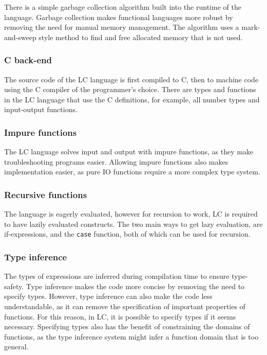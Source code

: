 \documentclass[12pt]{article}
\begin{document}
There is a simple garbage collection algorithm built into the runtime of the
language. Garbage collection makes functional languages more robust by removing
the need for manual memory management. The algorithm uses a mark-and-sweep style
method to find and free allocated memory that is not used.

\subsubsection{C back-end}

The source code of the LC language is first compiled to C, then to machine code
using the C compiler of the programmer's choice. There are types and functions
in the LC language that use the C definitions, for example, all number types and
input-output functions.

\subsubsection{Impure functions}

The LC language solves input and output with impure functions, as they make
troubleshooting programs easier. Allowing impure functions also makes
implementation easier, as pure IO functions require a more complex type system.

\subsubsection{Recursive functions}

The language is eagerly evaluated, however for recursion to work, LC is required
to have lazily evaluated constructs. The two main ways to get lazy evaluation,
are if-expressions, and the \verb$case$ function, both of which can be used for
recursion.

\subsubsection{Type inference}

The types of expressions are inferred during compilation time to ensure
type-safety. Type inference makes the code more concise by removing the need to
specify types. However, type inference can also make the code less
understandable, as it can remove the specification of important properties of
functions. For this reason, in LC, it is possible to specify types if it seems
necessary. Specifying types also has the benefit of constraining the domains of
functions, as the type inference system might infer a function domain that is
too general.
\end{document}
